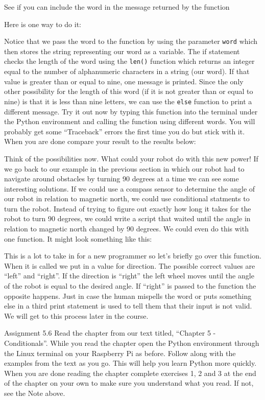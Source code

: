 \documentclass[
]{book}
\begin{document}
See if you can include the word in the message returned by the function

Here is one way to do it:

Notice that we pass the word to the function by using the parameter \texttt{word} which then stores the string representing our word as a variable. The if statement checks the length of the word using the \texttt{len()} function which returns an integer equal to the number of alphanumeric characters in a string (our word). If that value is greater than or equal to nine, one message is printed. Since the only other possibility for the length of this word (if it is not greater than or equal to nine) is that it is less than nine letters, we can use the \texttt{else} function to print a different message. Try it out now by typing this function into the terminal under the Python environment and calling the function using different words. You will probably get some ``Traceback'' errors the first time you do but stick with it. When you are done compare your result to the results below:

Think of the possibilities now. What could your robot do with this new power! If we go back to our example in the previous section in which our robot had to navigate around obstacles by turning 90 degrees at a time we can see some interesting solutions. If we could use a compass sensor to determine the angle of our robot in relation to magnetic north, we could use conditional statments to turn the robot. Instead of trying to figure out exactly how long it takes for the robot to turn 90 degrees, we could write a script that waited until the angle in relation to magnetic north changed by 90 degrees. We could even do this with one function. It might look something like this:

This is a lot to take in for a new programmer so let's briefly go over this function. When it is called we put in a value for direction. The possible correct values are ``left'' and ``right''. If the direction is ``right'' the left wheel moves until the angle of the robot is equal to the desired angle. If ``right'' is passed to the function the opposite happens. Just in case the human mispells the word or puts something else in a third print statement is used to tell them that their input is not valid. We will get to this process later in the course.

Assignment 5.6
Read the chapter from our text titled, ``Chapter 5 - Conditionals''. While you read the chapter open the Python environment through the Linux terminal on your Raspberry Pi as before. Follow along with the examples from the text as you go. This will help you learn Python more quickly. When you are done reading the chapter complete exercises 1, 2 and 3 at the end of the chapter on your own to make sure you understand what you read. If not, see the Note above.
\end{document}
